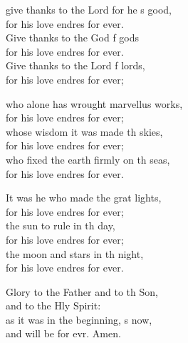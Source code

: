 \settowidth{\versewidth}{O give thanks to the Lord for he is good, *}
\begin{psalmverse}%
  \begin{patverse}
 give thanks to the Lord for he \pointup{\i}s good,\Med\\
    for his love endres for ever.\\
Give thanks to the God f gods\Med\\
    for his love endres for ever.\\
Give thanks to the Lord f lords,\Med\\
    for his love endres for ever;

who alone has wrought marvellus works,\Med\\
    for his love endres for ever;\\
whose wisdom it was made th skies,\Med\\
    for his love endres for ever;\\
who fixed the earth firmly on th seas,\Med\\
    for his love endres for ever.

It was he who made the grat lights,\Med\\
    for his love endres for ever;\\
the sun to rule in th day,\Med\\
    for his love endres for ever;\\
the moon and stars in th night,\Med\\
    for his love endres for ever.

Glory to the Father and to th Son,\Med\\
    and to the Hly Spirit:\\
as it was in the beginning, \pointup{\i}s now,\Med\\
    and will be for evr. Amen.
  \end{patverse}
\end{psalmverse}
